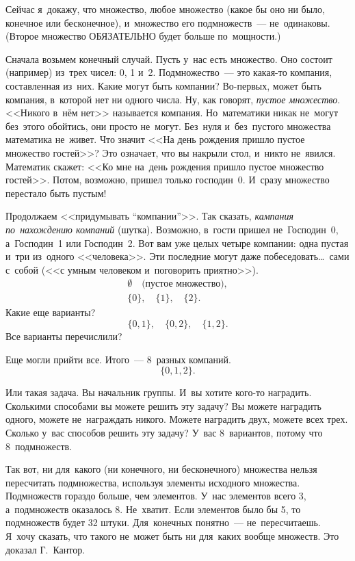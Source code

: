 Сейчас я~докажу, что множество, любое множество (какое бы оно ни было, конечное или бесконечное),
и~множество его подмножеств~--- не~одинаковы. (Второе множество ОБЯЗАТЕЛЬНО будет больше
по~мощности.)

Сначала возьмем конечный случай. Пусть у~нас есть множество. Оно состоит (например) из~трех чисел:
0, 1 и~2. Подмножество~--- это какая-то компания, составленная из~них. Какие могут быть компании?
Во-первых, может быть компания, в~которой нет ни одного числа. Ну, как говорят, \textit{пустое множество}.
<<Никого в~нём нет>> называется компания. Но~математики никак не~могут без~этого обойтись, они
просто не~могут. Без~нуля и~без~пустого множества математика не~живет. Что значит <<На день
рождения пришло пустое множество гостей>>? Это означает, что вы накрыли стол, и~никто не~явился.
Математик скажет:\vadjust{\pagebreak} <<Ко мне на~день рож\-де\-ния пришло пустое множество гостей>>. Потом, возможно,
пришел только господин~0. И~сразу множество перестало быть пустым!

Продолжаем <<придумывать ``компании''>>. Так сказать, \textit{кампания по~нахождению компаний} (шутка).
Возможно, в~гости пришел не~Господин~0, а~Господин~1 или Господин~2. Вот вам уже целых четыре компании: одна пустая и~три
из~одного <<человека>>. Эти последние могут даже побеседовать\ldots\ сами с~собой (<<с умным человеком
и~поговорить приятно>>).
\begin{gather*}
\emptyset\quad
\text{(пустое множество)},\\
\{0\},\quad
\{1\},\quad
\{2\}.
\end{gather*}
Какие еще варианты?
$$
\{0,1\},\quad
\{0,2\},\quad
\{1,2\}.
$$
Все варианты перечислили?

Еще могли прийти все. Итого~--- 8~разных компаний.
$$
\{0,1,2\}.
$$

Или такая задача. Вы начальник группы. И~вы хотите кого-то наградить. Сколькими способами вы можете
решить эту задачу? Вы можете наградить одного, можете не~награждать никого. Можете наградить двух,
можете всех трех. Сколько у~вас способов решить эту задачу? У~вас 8~вариантов, потому что 8~подмножеств.

Так вот, ни для~какого (ни конечного, ни бесконечного) множества нельзя пересчитать подмножества,
используя элементы исходного множества. Подмножеств гораздо больше, чем элементов. У~нас элементов
всего 3, а~подмножеств оказалось 8. Не~хватит. Если элементов было бы 5, то подмножеств будет 32
штуки. Для~конечных понятно~--- не~пересчитаешь. Я~хочу сказать, что такого не~может быть ни
для~каких вообще множеств. Это доказал Г.~Кантор.

